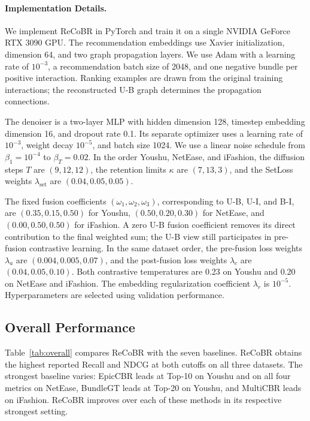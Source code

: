 \documentclass[letterpaper]{article}
\begin{document}
\paragraph{Implementation Details.}
We implement ReCoBR in PyTorch and train it on a single NVIDIA
GeForce RTX 3090 GPU. The recommendation embeddings use Xavier
initialization, dimension 64, and two graph propagation layers.
We use Adam with a learning rate of $10^{-3}$, a recommendation
batch size of 2048, and one negative bundle per positive
interaction. Ranking examples are drawn from the original
training interactions; the reconstructed U-B graph determines
the propagation connections.

The denoiser is a two-layer MLP with hidden dimension 128,
timestep embedding dimension 16, and dropout rate 0.1. Its
separate optimizer uses a learning rate of $10^{-3}$, weight
decay $10^{-5}$, and batch size 1024. We use a linear noise
schedule from $\beta_1=10^{-4}$ to $\beta_T=0.02$. In the order
Youshu, NetEase, and iFashion, the diffusion steps $T$ are
$(9,12,12)$, the retention limits $\kappa$ are $(7,13,3)$, and
the SetLoss weights $\lambda_{\mathrm{set}}$ are
$(0.04,0.05,0.05)$.

The fixed fusion coefficients $(\omega_1,\omega_2,\omega_3)$,
corresponding to U-B, U-I, and B-I, are $(0.35,0.15,0.50)$
for Youshu, $(0.50,0.20,0.30)$ for NetEase, and
$(0.00,0.50,0.50)$ for iFashion. A zero U-B fusion coefficient
removes its direct contribution to the final weighted sum;
the U-B view still participates in pre-fusion contrastive
learning. In the same dataset order, the pre-fusion loss
weights $\lambda_a$ are $(0.004,0.005,0.07)$, and the
post-fusion loss weights $\lambda_c$ are $(0.04,0.05,0.10)$.
Both contrastive temperatures are 0.23 on Youshu and 0.20 on
NetEase and iFashion. The embedding regularization coefficient
$\lambda_r$ is $10^{-5}$. Hyperparameters are selected using
validation performance.


\subsection{Overall Performance}

Table~\ref{tab:overall} compares ReCoBR with the seven baselines.
ReCoBR obtains the highest reported Recall and NDCG at both
cutoffs on all three datasets. The strongest baseline varies:
EpicCBR leads at Top-10 on Youshu and on all four metrics on
NetEase, BundleGT leads at Top-20 on Youshu, and MultiCBR leads
on iFashion. ReCoBR improves over each of these methods in its
respective strongest setting.
\end{document}
